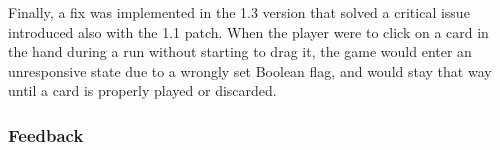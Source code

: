 Finally, a fix was implemented in the 1.3 version that solved a critical issue introduced also with the 1.1 patch. When the player were to click on a card in the hand during a run without starting to drag it, the game would enter an unresponsive state due to a wrongly set Boolean flag, and would stay that way until a card is properly played or discarded.



\subsubsection{Feedback}

